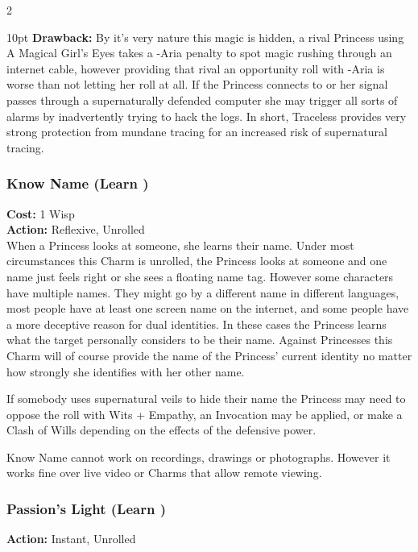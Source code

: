\begin{multicols}{2}
\begin{myindentpar}{10pt}
\textbf{Drawback:} By it's very nature this magic is hidden, a rival Princess using A Magical Girl's Eyes takes a -Aria penalty to spot magic rushing through an internet cable, however providing that rival an opportunity roll with -Aria is worse than not letting her roll at all. If the Princess connects to or her signal passes through a supernaturally defended computer she may trigger all sorts of alarms by inadvertently trying to hack the logs. In short, Traceless provides very strong protection from mundane tracing for an increased risk of supernatural tracing. \end{myindentpar}

\subsubsection*{Know Name (Learn \textbullet)}

\noindent \textbf{Cost:} 1 Wisp\\

\noindent \textbf{Action:} Reflexive, Unrolled\\

\noindent When a Princess looks at someone, she learns their name. Under most circumstances this Charm is unrolled, the Princess looks at someone and one name just feels right or she sees a floating name tag. However some characters have multiple names. They might go by a different name in different languages, most people have at least one screen name on the internet, and some people have a more deceptive reason for dual identities. In these cases the Princess learns what the target personally considers to be their name. Against Princesses this Charm will of course provide the name of the Princess' current identity no matter how strongly she identifies with her other name. 

If somebody uses supernatural veils to hide their name the Princess may need to oppose the roll with Wits + Empathy, an Invocation may be applied, or make a Clash of Wills depending on the effects of the defensive power.

Know Name cannot work on recordings, drawings or photographs. However it works fine over live video or Charms that allow remote viewing. 

\subsubsection*{Passion's Light (Learn \textbullet)}

\noindent \textbf{Action:} Instant, Unrolled


\end{multicols}
